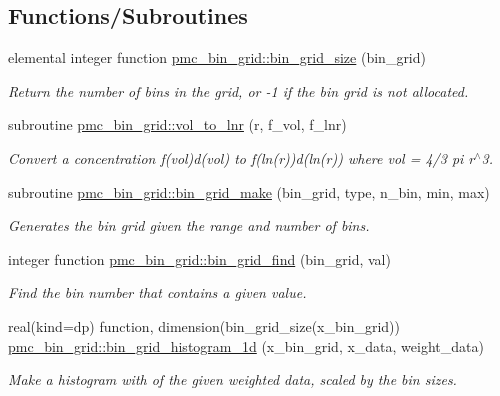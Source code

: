 \subsection*{Functions/\+Subroutines}
\begin{DoxyCompactItemize}
\item 
elemental integer function \mbox{\hyperlink{namespacepmc__bin__grid_add81887392bce2b981cecd3cfe553a5f}{pmc\+\_\+bin\+\_\+grid\+::bin\+\_\+grid\+\_\+size}} (bin\+\_\+grid)
\begin{DoxyCompactList}\small\item\em Return the number of bins in the grid, or -\/1 if the bin grid is not allocated. \end{DoxyCompactList}\item 
subroutine \mbox{\hyperlink{namespacepmc__bin__grid_abc23e1f905843cf09accd4dc7275ab5b}{pmc\+\_\+bin\+\_\+grid\+::vol\+\_\+to\+\_\+lnr}} (r, f\+\_\+vol, f\+\_\+lnr)
\begin{DoxyCompactList}\small\item\em Convert a concentration f(vol)d(vol) to f(ln(r))d(ln(r)) where vol = 4/3 pi r$^\wedge$3. \end{DoxyCompactList}\item 
subroutine \mbox{\hyperlink{namespacepmc__bin__grid_a32e33f03578d23808536c09a6211a286}{pmc\+\_\+bin\+\_\+grid\+::bin\+\_\+grid\+\_\+make}} (bin\+\_\+grid, type, n\+\_\+bin, min, max)
\begin{DoxyCompactList}\small\item\em Generates the bin grid given the range and number of bins. \end{DoxyCompactList}\item 
integer function \mbox{\hyperlink{namespacepmc__bin__grid_a132c58d7b2762a65c43ede00ef90d41d}{pmc\+\_\+bin\+\_\+grid\+::bin\+\_\+grid\+\_\+find}} (bin\+\_\+grid, val)
\begin{DoxyCompactList}\small\item\em Find the bin number that contains a given value. \end{DoxyCompactList}\item 
real(kind=dp) function, dimension(bin\+\_\+grid\+\_\+size(x\+\_\+bin\+\_\+grid)) \mbox{\hyperlink{namespacepmc__bin__grid_a89431948ddfba118694e7ef50b09d32b}{pmc\+\_\+bin\+\_\+grid\+::bin\+\_\+grid\+\_\+histogram\+\_\+1d}} (x\+\_\+bin\+\_\+grid, x\+\_\+data, weight\+\_\+data)
\begin{DoxyCompactList}\small\item\em Make a histogram with of the given weighted data, scaled by the bin sizes. \end{DoxyCompactList}\item 

\end{DoxyCompactItemize}
